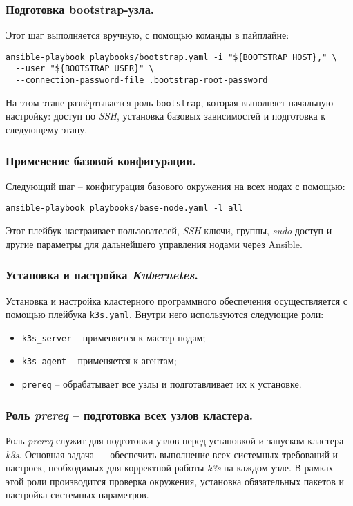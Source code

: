 \subsubsection{Подготовка bootstrap-узла.} Этот шаг выполняется вручную, с помощью команды в пайплайне:

\begin{lstlisting}
ansible-playbook playbooks/bootstrap.yaml -i "${BOOTSTRAP_HOST}," \
  --user "${BOOTSTRAP_USER}" \
  --connection-password-file .bootstrap-root-password
\end{lstlisting}

На этом этапе развёртывается роль \lstinline{bootstrap}, которая выполняет начальную настройку: доступ по \textit{SSH}, установка базовых зависимостей и подготовка к следующему этапу.

\subsubsection{Применение базовой конфигурации.} Следующий шаг -- конфигурация базового окружения на всех нодах с помощью:

\begin{lstlisting}
ansible-playbook playbooks/base-node.yaml -l all
\end{lstlisting}

Этот плейбук настраивает пользователей, \textit{SSH}-ключи, группы, \textit{sudo}-доступ и другие параметры для дальнейшего управления нодами через Ansible.

\subsubsection{Установка и настройка \textit{Kubernetes}.} Установка и настройка кластерного программного обеспечения осуществляется с помощью плейбука \lstinline{k3s.yaml}. Внутри него используются следующие роли:

\begin{itemize}
  \item \lstinline{k3s_server} -- применяется к мастер-нодам;
  \item \lstinline{k3s_agent} -- применяется к агентам;
  \item \lstinline{prereq} -- обрабатывает все узлы и подготавливает их к установке.
\end{itemize}

\subsubsection{Роль \textit{prereq} -- подготовка всех узлов кластера.}
Роль \textit{prereq} служит для подготовки узлов перед установкой и запуском кластера \textit{k3s}. Основная задача — обеспечить выполнение всех системных требований и настроек, необходимых для корректной работы \textit{k3s} на каждом узле. В рамках этой роли производится проверка окружения, установка обязательных пакетов и настройка системных параметров.

